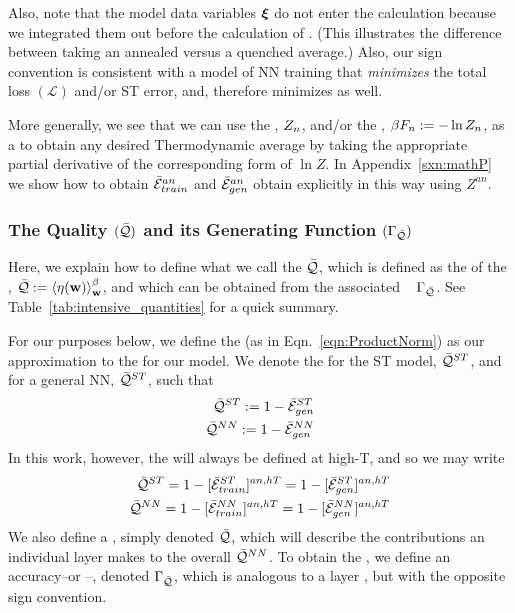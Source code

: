 Also, note that the model data variables $\boldsymbol{\xi}$ do not enter the calculation because we 
integrated them out before the calculation of \ThermalAverage.
(This illustrates the difference between taking an annealed versus a quenched average.)
Also, our sign convention is consistent with a model of NN training that \emph{minimizes} the total loss
$(\mathcal{L})$ and/or ST error, and, therefore minimizes \FreeEnergies as well.

More generally, we see that we can use the \PartitionFunction, $Z_{n}$,
and/or the \FreeEnergy, $\beta F_{n}:=-\ln Z_{n}$, as a \GeneratingFunction to obtain any
desired Thermodynamic average by taking the appropriate partial derivative
of the corresponding form of $\ln Z$.
In Appendix~\ref{sxn:mathP} we show how to obtain 
$\bar{\mathcal{E}}_{train}^{an}$ and $\bar{\mathcal{E}}_{gen}^{an}$ obtain explicitly in this way using $Z^{an}$.
\subsubsection{The Quality \texorpdfstring{$(\bar{\mathcal{Q}})$}{Q} and its Generating Function \texorpdfstring{$(\Gamma_{\bar{\mathcal{Q}}})$}{(Gamma Q)}}
Here, we explain how to define what we call the \Quality $\bar{\mathcal{Q}}$, which is
defined as the \ThermalAverage of the \SelfOverlap,  $\bar{\mathcal{Q}}:=\left\langle \eta({\mathbf{w}}) \right\rangle_{\mathbf w}^{\beta}$,
and which can be obtained from the associated \emph{\Quality~\GeneratingFunction} $\Gamma_{\bar{\mathcal{Q}}}$.
See Table~\ref{tab:intensive_quantities} for a quick summary.


For our purposes below, we define the \ModelQuality (as in Eqn.~\ref{eqn:ProductNorm}) as our approximation to the
\AverageGeneralizationAccuracy for our model. 
We denote the \ModelQuality for the ST \Perceptron model, $\bar{\mathcal{Q}}^{ST}$,
and for a general NN, $\bar{\mathcal{Q}}^{ST}$, such that
\begin{align}
  \label{eqn:model_pre_qualities}
\bar{\mathcal{Q}}^{ST}:=1-\bar{\mathcal{E}}_{gen}^{ST}  \\ 
\bar{\mathcal{Q}}^{NN}:=1-\bar{\mathcal{E}}_{gen}^{NN}  
\end{align}
In this work, however, the \Quality will always be defined at high-T, and so we may write
\begin{align}
  \label{eqn:model_qualities}
  \bar{\mathcal{Q}}^{ST}=1-[\bar{\mathcal{E}}_{train}^{ST}]^{an,hT}=1-[\bar{\mathcal{E}}_{gen}^{ST}]^{an,hT} \\
  \bar{\mathcal{Q}}^{NN}=1-[\bar{\mathcal{E}}_{train}^{NN}]^{an,hT}=1-[\bar{\mathcal{E}}_{gen}^{NN}]^{an,hT} 
\end{align}
We also define a \LayerQuality, simply denoted $\bar{\mathcal{Q}}$,
which will describe the contributions an individual layer makes to the overall \ModelQuality $\bar{\mathcal{Q}}^{NN}$.
To obtain the \LayerQuality, we define an accuracy--or \Quality--\GeneratingFunction, denoted $\Gamma_{\bar{\mathcal{Q}}}$, which
is analogous to a layer \FreeEnergy, but with the opposite sign convention.

